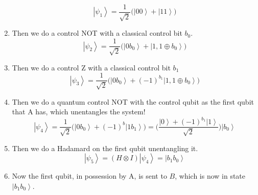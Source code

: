 \documentclass{article}
\newcommand{\ket}[1]{\ensuremath{\left|#1\right\rangle}}
\begin{document}
\begin{theorem}
\begin{enumerate}
\begin{equation}
            \ket{\psi_1} = \frac{1}{\sqrt{2}} \big( \ket{00} + \ket{11} \big)
          \end{equation}
        \item Then we do a control NOT with a classical control bit $b_0$. 
          \begin{equation} 
            \ket{\psi_2} = \frac{1}{\sqrt{2}} \big( \ket{0 b_0} + \ket{1, 1 \oplus b_0} \big)
          \end{equation}
        \item Then we do a control Z with a classical control bit $b_1$
          \begin{equation} 
            \ket{\psi_3} = \frac{1}{\sqrt{2}} \big( \ket{0 b_0} + (-1)^{b_1} \ket{1, 1 \oplus b_0} \big)
          \end{equation}
        \item Then we do a quantum control NOT with the control qubit as the first qubit that A has, which unentangles the system! 
          \begin{equation} 
            \ket{\psi_4} = \frac{1}{\sqrt{2}} \big( \ket{0 b_0} + (-1)^b \ket{1 b_1} \big) = \bigg( \frac{\ket{0} + (-1)^{b_1} \ket{1}}{\sqrt{2}} \bigg) \ket{b_0} 
          \end{equation}
        \item Then we do a Hadamard on the first qubit unentangling it. 
          \begin{equation} 
            \ket{\psi_5} = (H \otimes I) \ket{\psi_4} = \ket{b_1 b_0} 
          \end{equation}
        \item Now the first qubit, in possession by A, is sent to $B$, which is now in state $\ket{b_1 b_0}$. 
      \end{enumerate}
    \end{theorem}
\end{document}
